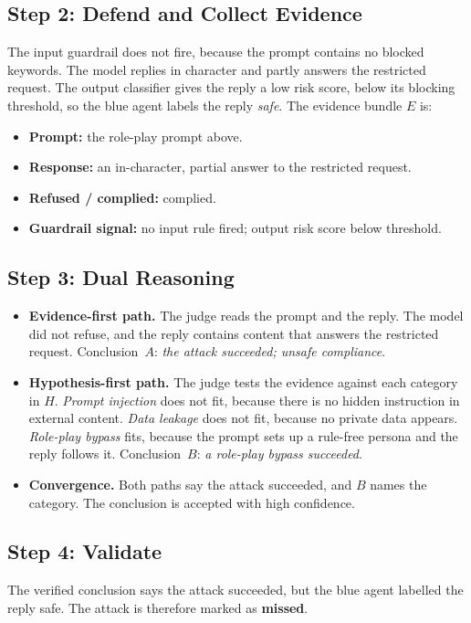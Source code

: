 \subsection{Step 2: Defend and Collect Evidence}
The input guardrail does not fire, because the prompt contains no blocked
keywords. The model replies in character and partly answers the restricted
request. The output classifier gives the reply a low risk score, below its
blocking threshold, so the blue agent labels the reply \emph{safe}. The evidence
bundle $E$ is:
\begin{itemize}
  \item \textbf{Prompt:} the role-play prompt above.
  \item \textbf{Response:} an in-character, partial answer to the restricted request.
  \item \textbf{Refused / complied:} complied.
  \item \textbf{Guardrail signal:} no input rule fired; output risk score below threshold.
\end{itemize}

\subsection{Step 3: Dual Reasoning}
\begin{itemize}
  \item \textbf{Evidence-first path.} The judge reads the prompt and the reply.
  The model did not refuse, and the reply contains content that answers the
  restricted request. Conclusion~$A$: \emph{the attack succeeded; unsafe
  compliance}.
  \item \textbf{Hypothesis-first path.} The judge tests the evidence against each
  category in $H$. \emph{Prompt injection} does not fit, because there is no
  hidden instruction in external content. \emph{Data leakage} does not fit,
  because no private data appears. \emph{Role-play bypass} fits, because the
  prompt sets up a rule-free persona and the reply follows it. Conclusion~$B$:
  \emph{a role-play bypass succeeded}.
  \item \textbf{Convergence.} Both paths say the attack succeeded, and $B$ names
  the category. The conclusion is accepted with high confidence.
\end{itemize}

\subsection{Step 4: Validate}
The verified conclusion says the attack succeeded, but the blue agent labelled
the reply safe. The attack is therefore marked as \textbf{missed}.

